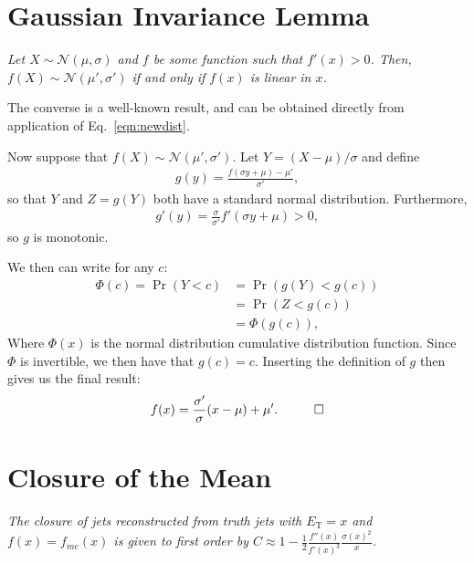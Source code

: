 \section{Gaussian Invariance Lemma}
\label{sec:lemma}

{\it Let $X\sim \mathcal{N}(\mu,\sigma)$ and $f$ be some function such that $f'(x)>0$.  Then, $f(X)\sim\mathcal{N}(\mu',\sigma')$ if and only if $f(x)$ is linear in $x$.}

\vspace{5mm}

 The converse is a well-known result, and can be obtained directly from application of Eq.~\ref{eqn:newdist}.

Now suppose that $f(X)\sim\mathcal{N}(\mu',\sigma')$.  Let $Y=(X-\mu)/\sigma$ and define 
\begin{align}
g(y)=\frac{f(\sigma y+\mu)-\mu'}{\sigma'},
\end{align}
so that $Y$ and $Z=g(Y)$ both have a standard normal distribution. Furthermore,
\begin{align}
g'(y) = \frac{\sigma}{\sigma'}f'(\sigma y+\mu) > 0,
\end{align}
so $g$ is monotonic.

We then can write for any $c$:
\begin{align}
\nonumber
\Phi(c)=\Pr(Y<c)&=\Pr(g(Y)<g(c))\\\nonumber
&=\Pr(Z<g(c))\\
&=\Phi(g(c)),
\end{align}
Where $\Phi(x)$ is the normal distribution cumulative distribution function. Since $\Phi$ is invertible, we then have that $g(c)=c$.  Inserting the definition of $g$ then gives us the final result:
\begin{align}
f(x)=\frac{\sigma'}{\sigma} (x-\mu)+\mu'.\hspace{1 cm}\Box
\end{align}

\section{Closure of the Mean}
\label{sec:mean_nonclosure}
{\it The closure of jets reconstructed from truth jets with $E_\text{T} = x$ and $f(x)=f_{me}(x)$ is given to first order by $C\approx 1-\frac{1}{2}\frac{f''(x)}{f'(x)^3}\frac{\sigma(x)^2}{x}$.}

\vspace{5mm}


